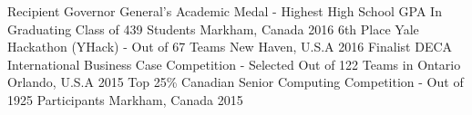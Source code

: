 
\begin{cvhonors}

   \cvhonor
    {Recipient} %
    {Governor General's Academic Medal - Highest High School GPA In Graduating Class of 439 Students} %
    {Markham, Canada} %
    {2016} %
 \cvhonor
    {6th Place} %
    {Yale Hackathon (YHack) - Out of 67 Teams} %
    {New Haven, U.S.A} %
    {2016} %
 \cvhonor
    {Finalist} %
    {DECA International Business Case Competition - Selected Out of 122 Teams in Ontario} %
    {Orlando, U.S.A} %
    {2015} %
  \cvhonor
    {Top 25\%} %
    {Canadian Senior Computing Competition - Out of 1925 Participants} %
    {Markham, Canada} %
    {2015} %


\end{cvhonors}